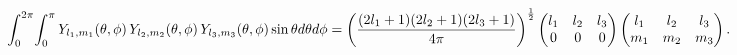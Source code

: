 \[\int_{0}^{2\pi}\!\int_{0}^{\pi}\mathop{Y_{{l_{1}},{m_{1}}}\/}\nolimits\!\left(%
\theta,\phi\right)\mathop{Y_{{l_{2}},{m_{2}}}\/}\nolimits\!\left(\theta,\phi%
\right)\mathop{Y_{{l_{3}},{m_{3}}}\/}\nolimits\!\left(\theta,\phi\right)%
\mathop{\sin\/}\nolimits\theta d\theta d\phi=\left(\frac{(2l_{1}+1)(2l_{2}+1)(%
2l_{3}+1)}{4\pi}\right)^{\frac{1}{2}}\begin{pmatrix}l_{1}&l_{2}&l_{3}\\
0&0&0\end{pmatrix}\begin{pmatrix}l_{1}&l_{2}&l_{3}\\
m_{1}&m_{2}&m_{3}\end{pmatrix}.\]